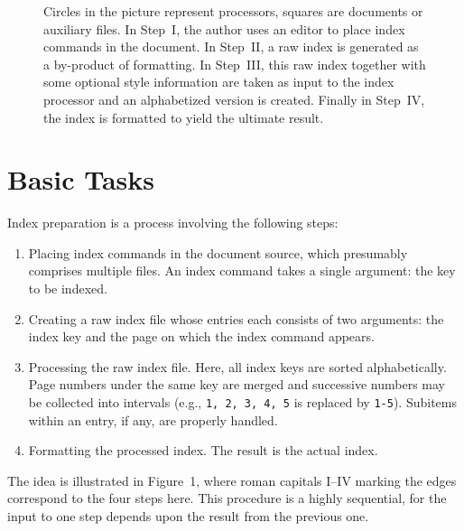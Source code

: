\begin{figure}

\caption[{\it The sequential flow of index processing\/}.]{Circles
in the picture represent processors,
squares are documents or auxiliary files.  In Step~I, the author uses an
editor to place index commands in the document.  In Step~II, a raw index
is generated as a by-product of formatting.  In Step~III, this raw index
together with some optional style information are taken as input to
the index processor and an alphabetized version is created.
Finally in Step~IV, the index is formatted to yield the ultimate result.}
\end{figure}

\section{Basic Tasks}
Index preparation is a process involving the following steps:
\renewcommand{\labelenumi}{\Roman{enumi}.}   %
\begin{enumerate}
  \item Placing index commands in the document source, which presumably
	comprises multiple files.  An index command takes a single
	argument: the key to be indexed.
  \item Creating a raw index file whose entries each consists
	of two arguments: the index key and the page on which the index
	command appears.
  \item Processing the raw index file.  Here, all index keys are
	sorted alphabetically.  Page numbers under the same key are merged
	and successive numbers may be collected into
	intervals (e.g., \verb|1, 2, 3, 4, 5| is replaced by \verb|1-5|).
	Subitems within an entry, if any, are properly handled.
  \item Formatting the processed index.  The result is the actual index.
\end{enumerate}
\renewcommand{\labelenumi}{\arabic{enumi}.}   %
The idea is illustrated in Figure~1, where roman capitals I--IV marking
the edges correspond to the four steps here.
This procedure is a highly sequential,
for the input to one step depends upon the result from the previous one.

